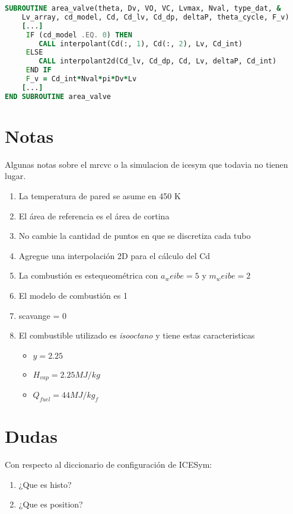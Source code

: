 \begin{lstlisting}[language=fortran]
SUBROUTINE area_valve(theta, Dv, VO, VC, Lvmax, Nval, type_dat, &
    Lv_array, cd_model, Cd, Cd_lv, Cd_dp, deltaP, theta_cycle, F_v)
    [...]
     IF (cd_model .EQ. 0) THEN
        CALL interpolant(Cd(:, 1), Cd(:, 2), Lv, Cd_int)
     ELSE
        CALL interpolant2d(Cd_lv, Cd_dp, Cd, Lv, deltaP, Cd_int)
     END IF
     F_v = Cd_int*Nval*pi*Dv*Lv
    [...]
END SUBROUTINE area_valve
\end{lstlisting}


\section{Notas}
Algunas notas sobre el mrcvc o la simulacion de icesym que todavia no tienen
lugar.

\begin{enumerate}
    \item La temperatura de pared se asume en 450 K
    \item El área de referencia es el área de cortina
    \item No cambie la cantidad de puntos en que se discretiza cada tubo
    \item Agregue una interpolación 2D para el cálculo del Cd
    \item La combustión es estequeométrica con $a_weibe=5$ y $m_weibe=2$
    \item El modelo de combustión es 1
    \item scavange = 0
    \item El combustible utilizado es \emph{isooctano} y tiene estas
        caracteristicas 
        \begin{itemize}
            \item $y = 2.25$
            \item $H_{vap} = 2.25 MJ/kg$
            \item $Q_{fuel} = 44 MJ/kg_f$
        \end{itemize}
\end{enumerate}

\section{Dudas}
Con respecto al diccionario de configuración de ICESym:

\begin{enumerate}
    \item ¿Que es histo?
    \item ¿Que es position?
\end{enumerate}

